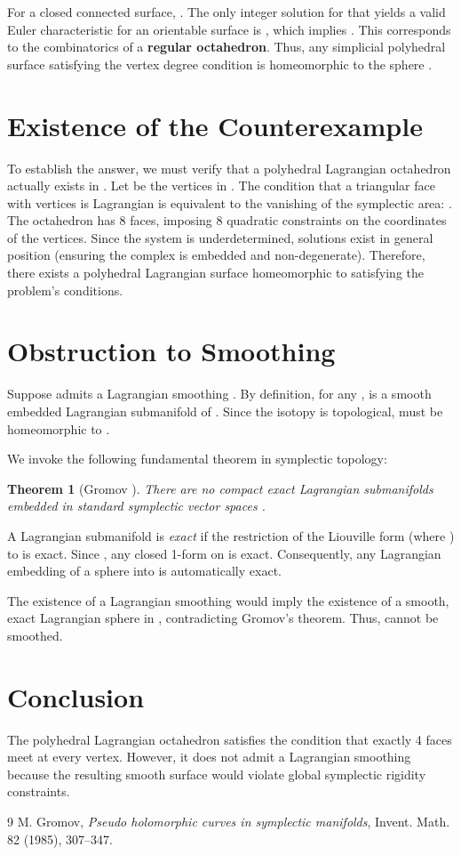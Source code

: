 \documentclass[12pt]{article}
\theoremstyle{plain}
\newtheorem{theorem}{Theorem}
\theoremstyle{definition}
\begin{document}
For a closed connected surface, . The only integer solution for  that yields a valid Euler characteristic for an orientable surface is , which implies . This corresponds to the combinatorics of a \textbf{regular octahedron}. Thus, any simplicial polyhedral surface satisfying the vertex degree condition is homeomorphic to the sphere .

\section{Existence of the Counterexample}

To establish the answer, we must verify that a polyhedral Lagrangian octahedron actually exists in .
Let  be the vertices in . The condition that a triangular face with vertices  is Lagrangian is equivalent to the vanishing of the symplectic area: .
The octahedron has 8 faces, imposing 8 quadratic constraints on the  coordinates of the vertices. Since the system is underdetermined, solutions exist in general position (ensuring the complex is embedded and non-degenerate).
Therefore, there exists a polyhedral Lagrangian surface  homeomorphic to  satisfying the problem's conditions.

\section{Obstruction to Smoothing}

Suppose  admits a Lagrangian smoothing . By definition, for any ,  is a smooth embedded Lagrangian submanifold of . Since the isotopy is topological,  must be homeomorphic to .

We invoke the following fundamental theorem in symplectic topology:

\begin{theorem}[Gromov \cite{Gromov85}]
There are no compact exact Lagrangian submanifolds embedded in standard symplectic vector spaces .
\end{theorem}

A Lagrangian submanifold  is \textit{exact} if the restriction of the Liouville form  (where ) to  is exact. Since , any closed 1-form on  is exact. Consequently, any Lagrangian embedding of a sphere  into  is automatically exact.

The existence of a Lagrangian smoothing  would imply the existence of a smooth, exact Lagrangian sphere in , contradicting Gromov's theorem. Thus,  cannot be smoothed.

\section{Conclusion}

The polyhedral Lagrangian octahedron satisfies the condition that exactly 4 faces meet at every vertex. However, it does not admit a Lagrangian smoothing because the resulting smooth surface would violate global symplectic rigidity constraints.

\begin{thebibliography}{9}
 M. Gromov, \textit{Pseudo holomorphic curves in symplectic manifolds}, Invent. Math. 82 (1985), 307--347.
\end{thebibliography}
\end{document}
